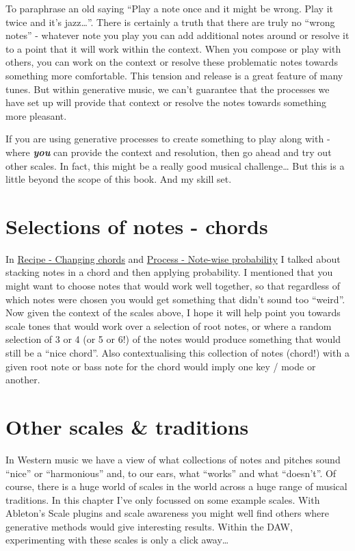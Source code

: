 \documentclass[
  12pt,
  letterpaper,
  oneside,
  open=any]{scrbook}
\begin{document}
To paraphrase an old saying ``Play a note once and it might be wrong.
Play it twice and it's jazz\ldots{}''. There is certainly a truth that
there are truly no ``wrong notes'' - whatever note you play you can add
additional notes around or resolve it to a point that it will work
within the context. When you compose or play with others, you can work
on the context or resolve these problematic notes towards something more
comfortable. This tension and release is a great feature of many tunes.
But within generative music, we can't guarantee that the processes we
have set up will provide that context or resolve the notes towards
something more pleasant.

If you are using generative processes to create something to play along
with - where \textbf{\emph{you}} can provide the context and resolution,
then go ahead and try out other scales. In fact, this might be a really
good musical challenge\ldots{} But this is a little beyond the scope of
this book. And my skill set.

\section{Selections of notes -
chords}\label{selections-of-notes---chords}

In \hyperref[Chapter-001-Recipe-Changing_Chords]{Recipe - Changing
chords} and \hyperref[Chapter-002-Process-Note_wise_probability]{Process
- Note-wise probability} I talked about stacking notes in a chord and
then applying probability. I mentioned that you might want to choose
notes that would work well together, so that regardless of which notes
were chosen you would get something that didn't sound too ``weird''. Now
given the context of the scales above, I hope it will help point you
towards scale tones that would work over a selection of root notes, or
where a random selection of 3 or 4 (or 5 or 6!) of the notes would
produce something that would still be a ``nice chord''. Also
contextualising this collection of notes (chord!) with a given root note
or bass note for the chord would imply one key / mode or another.

\section{Other scales \& traditions}\label{other-scales-traditions}

In Western music we have a view of what collections of notes and pitches
sound ``nice'' or ``harmonious'' and, to our ears, what ``works'' and
what ``doesn't''. Of course, there is a huge world of scales in the
world across a huge range of musical traditions. In this chapter I've
only focussed on some example scales. With Ableton's Scale plugins and
scale awareness you might well find others where generative methods
would give interesting results. Within the DAW, experimenting with these
scales is only a click away\ldots{}
\end{document}
